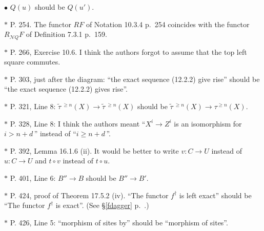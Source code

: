 \documentclass[12pt]{article}
\theoremstyle{remark}
\theoremstyle{definition}
\newtheorem{s}[thm]{\S}
\newcommand{\bu}{\bullet}
\newcommand{\cc}{\mathcal}
\newcommand{\C}{\mathcal C}
\DeclareMathOperator*{\co}{colim}
\DeclareMathOperator{\Hom}{Hom}%
\begin{document}
$\bu$ $Q(u)$ should be $Q(u')$.

\noindent $*$ P. 254. The functor $RF$ of Notation 10.3.4 p.~254 coincides with the functor $R_{\cc NQ}F$ of Definition 7.3.1 p.~159.

\noindent $*$ P. 266, Exercise 10.6. I think the authors forgot to assume that the top left square commutes.


\noindent $*$ P. 303, just after the diagram: ``the exact sequence (12.2.2) give rise'' should be ``the exact sequence (12.2.2) gives rise''.

\noindent $*$ P. 321, Line 8: $\widetilde\tau\,{}^{\ge n}(X)\to\widetilde\tau\,{}^{\ge n}(X)$ should be $\widetilde\tau\,{}^{\ge n}(X)\to\tau^{\ge n}(X)$.


\noindent $*$ P. 328, Line 8: I think the authors meant ``$X^i\to Z^i$ is an isomorphism for $i>n+d\,$'' instead of ``$i\ge n+d\,$''.

\noindent $*$ P. 392, Lemma 16.1.6 (ii). It would be better to write $v:C\to U$ instead of $u:C\to U$ and $t\circ v$ instead of $t\circ u$.

\noindent $*$ P. 401, Line 6: $B''\to B$ should be $B''\to B'$.
%
\begin{comment}
\begin{s}\label{c406}
P. 406. I don't understand the isomorphism 
$$
\left((f^t)\ \widehat{}A\right)(U)\simeq\co_{(V\to A)\in(\C_Y)_A^\wedge}\Hom_{(\C_Y)^\wedge}(f^t(V),U).
$$ 
I would have written 
$$
\left((f^t)\ \widehat{}A\right)(U)\simeq\co_{(V\to A)\in(\C_Y)_A}\Hom_{\C_X}(U,f^t(V)).
$$
\end{s}
\end{comment}
%
\noindent $*$ P. 424, proof of Theorem 17.5.2 (iv). ``The functor $f^\dagger$ is left exact'' should be ``The functor $f^\dagger$ is exact''. (See \S\ref{fdagger} p.~\pageref{fdagger}.) %

\noindent $*$ P. 426, Line 5: ``morphism of sites by'' should be ``morphism of sites''.
\end{document}
